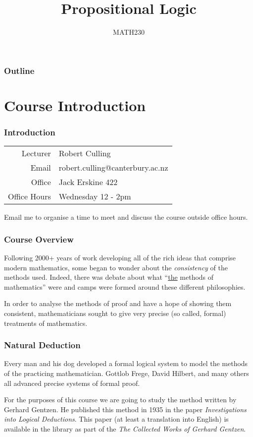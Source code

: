 \documentclass{beamer}
\title{Propositional Logic}
\author{MATH230}
\institute{Te Kura P\=angarau \\ Te Whare W\=ananga o Waitaha}
\date{}
\begin{document}
\begin{frame}

  \titlepage

\end{frame}

\begin{frame}
  \frametitle{Outline}

  \tableofcontents

\end{frame}

\section{Course Introduction}


\begin{frame}
	\frametitle{Introduction}

	\begin{tabular}{r l}
		Lecturer & Robert Culling \\
		Email & robert.culling@canterbury.ac.nz \\
		Office & Jack Erskine 422 \\
		Office Hours & Wednesday 12 - 2pm
	\end{tabular}

	Email me to organise a time to meet and discuss the course outside office hours. 
	

\end{frame}

\begin{frame}
	\frametitle{Course Overview}

	Following 2000+ years of work developing all of the rich ideas that comprise modern mathematics, some began to wonder about the \emph{consistency} of the methods used. Indeed, there was debate about what ``\underline{the} methods of mathematics'' were and camps were formed around these different philosophies. 

	\vspace{5mm}

	In order to analyse the methods of proof and have a hope of showing them consistent, mathematicians sought to give very precise (so called, formal) treatments of mathematics. 

\end{frame}

\begin{frame}
	\frametitle{Natural Deduction}

	Every man and his dog developed a formal logical system to model the methods of the practicing mathematician. Gottlob Frege, David Hilbert, and many others all advanced precise systems of formal proof. 

	\vspace{5mm}

	For the purposes of this course we are going to study the method written by Gerhard Gentzen. He published this method in 1935 in the paper \emph{Investigations into Logical Deductions}. This paper (at least a translation into English) is available in the library as part of the \emph{The Collected Works of Gerhard Gentzen}.
\end{frame}
\end{document}
